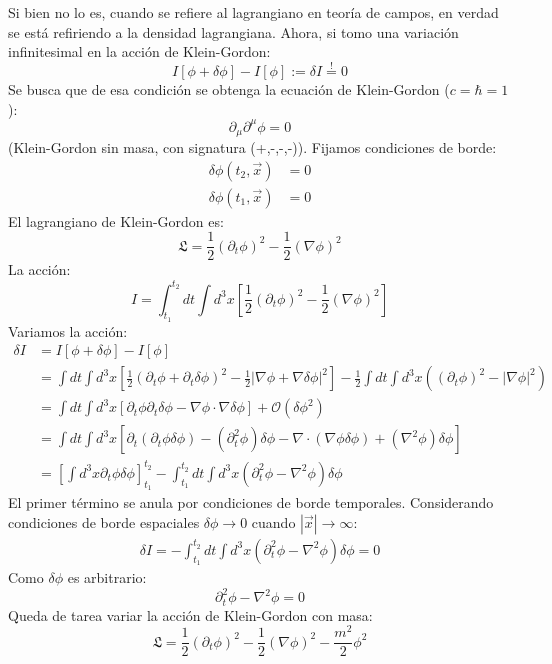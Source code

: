 \documentclass[../main.tex]{subfiles}
\begin{document}
Si bien no lo es, cuando se refiere al lagrangiano en teoría de campos, en verdad se está refiriendo a la densidad lagrangiana. Ahora, si tomo una variación infinitesimal en la acción de Klein-Gordon:
\begin{equation*}
  I[\phi+\delta \phi] - I[\phi] := \delta I \stackrel{!}{=} 0 
\end{equation*}
Se busca que de esa condición se obtenga la ecuación de Klein-Gordon ($c=\hbar=1$):
\begin{equation}
  \partial_\mu\partial^\mu \phi = 0
\end{equation}
(Klein-Gordon sin masa, con signatura (+,-,-,-)). Fijamos condiciones de borde:
\begin{align*}
  \delta \phi (t_2,\vec{x}) & = 0 \\
  \delta \phi (t_1,\vec{x}) & = 0
\end{align*}
El lagrangiano de Klein-Gordon es:
\begin{equation}
  \mathfrak{L} = \frac{1}{2}(\partial_t \phi)^2 - \frac{1}{2}(\nabla \phi)^2  %
\end{equation}
La acción:
\begin{equation}
  I = \int_{t_1}^{t_2}dt \int d^3x \left[ \frac{1}{2}(\partial_t\phi)^2 - \frac{1}{2}(\nabla\phi)^2 \right]
\end{equation}
Variamos la acción:
\begin{align*}
  \delta I & = I[\phi+\delta\phi] - I[\phi] \\
  & = \int dt \int d^3 x \left[ \frac{1}{2}(\partial_t\phi + \partial_t\delta\phi)^2 - \frac{1}{2}|\nabla\phi + \nabla\delta\phi|^2 \right] - \frac{1}{2}\int dt \int d^3x \left( (\partial_t\phi)^2 - |\nabla\phi|^2 \right) \\
  & = \int dt \int d^3x \left[ \partial_t \phi  \partial_t \delta \phi - \nabla\phi \cdot \nabla \delta \phi \right] + \mathcal{O}(\delta\phi^2) \\
  & = \int dt \int d^3x \left[ \partial_t (\partial_t \phi  \delta \phi) - (\partial_t^2 \phi) \delta \phi - \nabla \cdot (\nabla\phi  \delta \phi) + (\nabla^2 \phi) \delta \phi \right] \\
  & = \left[ \int d^3x  \partial_t \phi  \delta \phi \right]_{t_1}^{t_2} - \int_{t_1}^{t_2} dt \int d^3x  (\partial_t^2 \phi - \nabla^2 \phi) \delta \phi 
\end{align*}
El primer término se anula por condiciones de borde temporales. Considerando condiciones de borde espaciales $\delta\phi \to 0$ cuando $|\vec{x}| \to \infty$:
\begin{align*}
  \delta I = - \int_{t_1}^{t_2} dt \int d^3x  (\partial_t^2 \phi - \nabla^2 \phi) \delta \phi = 0 
\end{align*}
Como $\delta\phi$ es arbitrario:
\begin{equation*}
  \partial_t^2 \phi - \nabla^2 \phi = 0
\end{equation*}
Queda de tarea variar la acción de Klein-Gordon con masa:
\begin{equation}
  \mathfrak{L} = \frac{1}{2}(\partial_t\phi)^2 - \frac{1}{2}(\nabla\phi)^2 -\frac{m^2}{2}\phi^2  %
\end{equation}
\end{document}
